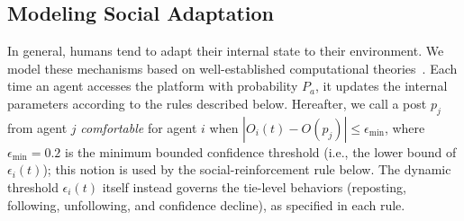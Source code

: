 \documentclass[pdflatex,sn-mathphys-num]{sn-jnl}%
\theoremstyle{thmstyleone}%
\theoremstyle{thmstyletwo}%
\theoremstyle{thmstylethree}%
\def\BoundedConfidence{\epsilon}
\begin{document}
\subsection{Modeling Social Adaptation}
In general, humans tend to adapt their internal state to their environment. We model these mechanisms based on well-established computational theories~\cite{Friedkin1990,Deffuant2000,Hegselmann2002,Sasahara2021}. Each
time an agent accesses the platform with probability $P_a$, it updates
the internal parameters according to the rules described below.
Hereafter, we call a post $p_j$ from agent $j$ \emph{comfortable} for agent $i$
when $|O_i(t) - O(p_j)| \leq \epsilon_{\min}$, where $\epsilon_{\min} = 0.2$ is the
minimum bounded confidence threshold (i.e., the lower bound of $\BoundedConfidence_i(t)$);
this notion is used by the social-reinforcement rule below. The dynamic threshold
$\BoundedConfidence_i(t)$ itself instead governs the tie-level behaviors
(reposting, following, unfollowing, and confidence decline), as specified in each rule.
\par
\end{document}
